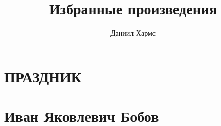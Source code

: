 \documentclass{article}
\title{Избранные произведения}
\author{Даниил Хармс}
\date{}
\begin{document}
\maketitle

\section{ПРАЗДНИК}


\section{Иван Яковлевич Бобов}

\end{document}

